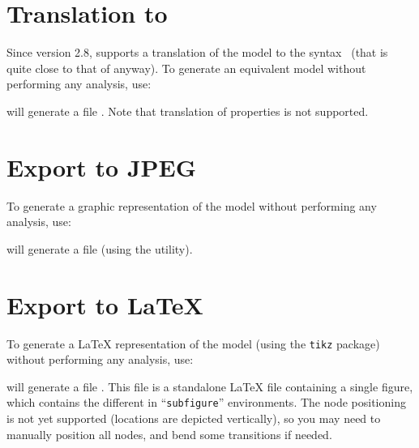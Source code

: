 \section{Translation to \hytech{}}

Since version 2.8, \imitator{} supports a translation of the model to the \hytech{} syntax~\cite{HHW95} (that is quite close to that of \imitator{} anyway).
To generate an equivalent \hytech{} model without performing any analysis, use:


\imitator{} will generate a file .
Note that translation of properties is not supported.



\section{Export to JPEG}

To generate a graphic representation of the \NIPTA{} model without performing any analysis, use:


\imitator{} will generate a file  (using the \gdot{} utility).



\section{Export to \LaTeX{}}

To generate a \LaTeX{} representation of the \NIPTA{} model (using the \texttt{tikz} package) without performing any analysis, use:


\imitator{} will generate a file .
This file is a standalone \LaTeX{} file containing a single figure, which contains the different \IPTA{} in ``\texttt{subfigure}'' environments.
The node positioning is not yet supported (locations are depicted vertically), so you may need to manually position all nodes, and bend some transitions if needed.





